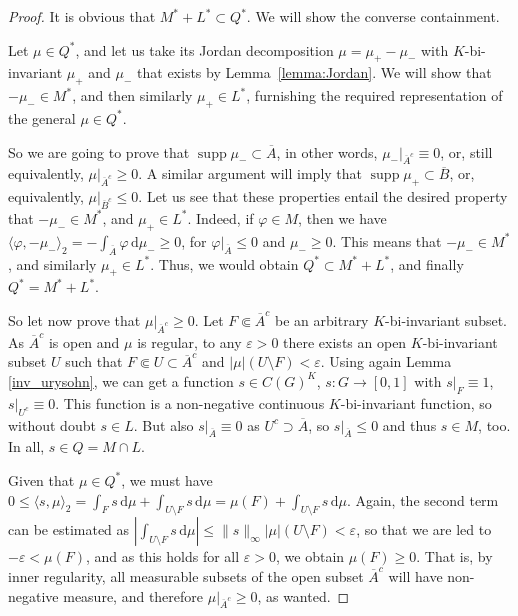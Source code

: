 \documentclass[[a4paper,english,12pt]{amsart}
\theoremstyle{plain}
\theoremstyle{remark}
\newcommand\supp{\operatorname{supp}}
\newcommand{\ff}{\varphi}
\newcommand{\ve}{\varepsilon}
\begin{document}
\begin{proof}
It is obvious that $M^* + L^* \subset Q^*$. We will show the converse containment.

Let $\mu \in Q^*$, and let us take its Jordan decomposition $\mu = \mu_{+} - \mu_{-}$ with $K$-bi-invariant $\mu_{+}$ and $\mu_{-}$ that exists by Lemma~\ref{lemma:Jordan}. We will show that $-\mu_{-} \in M^{*}$, and then similarly $\mu_{+} \in L^*$, furnishing the required representation of the general $\mu \in Q^*$. 

So we are going to prove that $\supp \mu_{-} \subset \overline{A}$, in other words, $\mu_{-}|_{\overline{A}^c} \equiv 0$, or, still equivalently, $\mu|_{\overline{A}^c} \ge 0$. A similar argument will imply that $\supp \mu_{+} \subset \overline{B}$, or, equivalently, $\mu|_{\overline{B}^c} \le 0$. Let us see that these properties entail the desired property that $-\mu_{-} \in M^{*}$, and $\mu_{+} \in L^{*}$. Indeed, if $\ff \in M$, then we have $\langle \ff, -\mu_{-} \rangle_2 = - \int_{\overline{A}} \ff \,\mbox{d}\mu_{-} \ge 0$, for $\ff|_{\overline{A}} \le 0$ and $\mu_{-} \ge 0$. This means that $-\mu_{-} \in M^{*}$, and similarly $\mu_{+} \in L^{*}$. Thus, we would obtain $Q^* \subset M^* + L^*$, and finally $Q^* = M^* + L^*$.

So let now prove that $\mu|_{\overline{A}^c} \ge 0$. Let $F \Subset \overline{A}^c$ be an arbitrary $K$-bi-invariant subset. As $\overline{A}^c$ is open and $\mu$ is regular, to any $\ve>0$ there exists an open $K$-bi-invariant subset  $U$  such that $F \Subset U \subset \overline{A}^c$ and $|\mu|(U\setminus F) < \ve$. Using again Lemma \ref{inv_urysohn}, we can get a function $s \in C(G)^{K}$, $s : G \to [0,1]$ with $s|_F \equiv 1$, $s|_{U^c} \equiv 0$. This function is a non-negative continuous $K$-bi-invariant function, so without doubt $s \in L$. But also $s|_{\overline{A}} \equiv 0$ as $U^c \supset \overline{A}$, so $s|_{\overline{A}}\le 0$ and thus $s \in M$, too. In all, $s \in Q = M\cap L$.

Given that $\mu \in Q^*$, we must have $0 \le \langle s, \mu \rangle_2 = \int_F s \,\mbox{d}\mu + \int_{U\setminus F} s \,\mbox{d}\mu = \mu(F) + \int_{U\setminus F} s \,\mbox{d}\mu$. Again, the second term can be estimated as $| \int_{U\setminus F} s \,\mbox{d} \mu| \le  \|s\|_\infty |\mu|(U\setminus F) < \ve$, so that we are led to $- \ve < \mu(F)$, and as this holds for all $\ve > 0$, we obtain $\mu(F)\ge 0$. That is, by inner regularity, all measurable subsets of the open subset $\overline{A}^c$ will have non-negative measure, and therefore $\mu|_{\overline{A}^c} \ge 0$, as wanted.
\end{proof}
\end{document}
